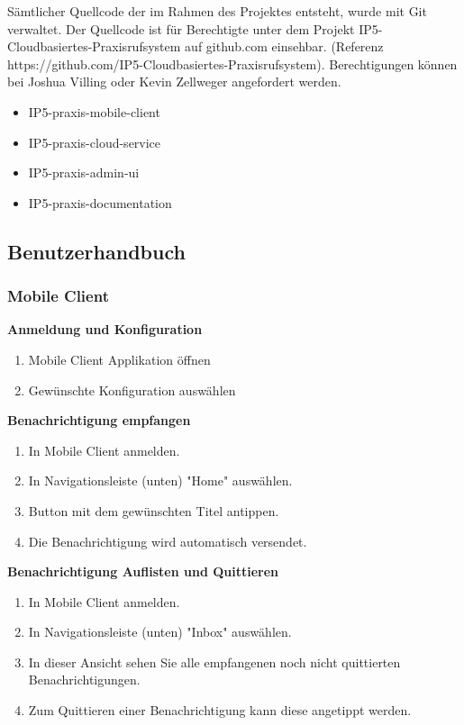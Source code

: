     Sämtlicher Quellcode der im Rahmen des Projektes entsteht, wurde mit Git verwaltet. Der Quellcode ist für Berechtigte unter dem Projekt IP5-Cloudbasiertes-Praxisrufsystem auf github.com einsehbar.
    (Referenz https://github.com/IP5-Cloudbasiertes-Praxisrufsystem). Berechtigungen können bei Joshua Villing oder Kevin Zellweger angefordert werden.

    \begin{itemize}
        \item IP5-praxis-mobile-client
        \item IP5-praxis-cloud-service
        \item IP5-praxis-admin-ui
        \item IP5-praxis-documentation
    \end{itemize}

    \subsection{Benutzerhandbuch}

        \subsubsection*{Mobile Client}

        \textbf{Anmeldung und Konfiguration}

        \begin{enumerate}
            \item Mobile Client Applikation öffnen
            \item Gewünschte Konfiguration auswählen
        \end{enumerate}

        \textbf{Benachrichtigung empfangen}

        \begin{enumerate}
            \item In Mobile Client anmelden.
            \item In Navigationsleiste (unten) "Home" auswählen.
            \item Button mit dem gewünschten Titel antippen.
            \item Die Benachrichtigung wird automatisch versendet.
        \end{enumerate}

        \textbf{Benachrichtigung Auflisten und Quittieren}

        \begin{enumerate}
            \item In Mobile Client anmelden.
            \item In Navigationsleiste (unten) "Inbox" auswählen.
            \item In dieser Ansicht sehen Sie alle empfangenen noch nicht quittierten Benachrichtigungen.
            \item Zum Quittieren einer Benachrichtigung kann diese angetippt werden.
        \end{enumerate}

